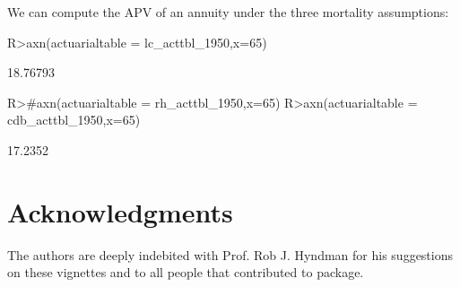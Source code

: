 \documentclass[nojss]{jss}
\begin{document}
We can compute the APV of an annuity under the three mortality assumptions:

\begin{Schunk}
\begin{Sinput}
R>axn(actuarialtable = lc_acttbl_1950,x=65)
\end{Sinput}
\begin{Soutput}
[1] 18.76793
\end{Soutput}
\begin{Sinput}
R>#axn(actuarialtable = rh_acttbl_1950,x=65)
R>axn(actuarialtable = cdb_acttbl_1950,x=65)
\end{Sinput}
\begin{Soutput}
[1] 17.2352
\end{Soutput}
\end{Schunk}


\section*{Acknowledgments}\label{sec:acknowledgments}

The authors are deeply indebited with Prof. Rob J. Hyndman for his suggestions on these vignettes and to all people that contributed to  package.



\end{document}
